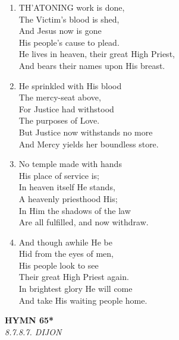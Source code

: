 \begin{enumerate}
    \item TH'ATONING work is done, \\
        The Victim's blood is shed, \\
        And Jesus now is gone \\
        His people's cause to plead. \\
        He lives in heaven, their great High Priest, \\
        And bears their names upon His breast.

    \item He sprinkled with His blood \\
        The mercy-seat above, \\
        For Justice had withstood \\
        The purposes of Love. \\
        But Justice now withstands no more \\
        And Mercy yields her boundless store.

    \item No temple made with hands \\
        His place of service is; \\
        In heaven itself He stands, \\
        A heavenly priesthood His; \\
        In Him the shadows of the law \\
        Are all fulfilled, and now withdraw.

    \item And though awhile He be \\
        Hid from the eyes of men, \\
        His people look to see \\
        Their great High Priest again. \\
        In brightest glory He will come \\
        And take His waiting people home.

\end{enumerate}

\newpage
\begin{center}
    {\Large \textbf{HYMN 65*}}
    \\
    \textit{8.7.8.7. DIJON}
\end{center}
\vspace{1em}

